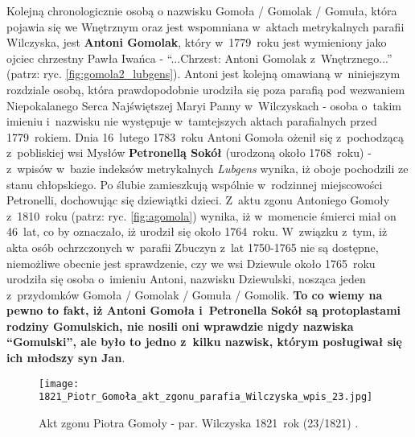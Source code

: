 Kolejną chronologicznie osobą o nazwisku Gomoła / Gomolak / Gomuła, która 
pojawia się we Wnętrznym oraz jest wspomniana w~aktach metrykalnych parafii 
Wilczyska, jest \textbf{Antoni Gomolak}, który w~1779~roku jest wymieniony 
jako ojciec chrzestny Pawła Iwańca - \enquote{...Chrzest: Antoni Gomolak 
z~Wnętrznego...} (patrz: ryc. \ref{fig:gomola2_lubgens}). Antoni jest kolejną 
omawianą w~niniejszym rozdziale osobą, która prawdopodobnie urodziła się poza 
parafią pod wezwaniem Niepokalanego Serca Najświętszej Maryi Panny 
w~Wilczyskach - osoba o~takim imieniu i~nazwisku nie występuje w~tamtejszych 
aktach parafialnych przed 1779~rokiem. Dnia 16~lutego 1783~roku Antoni Gomoła 
ożenił się z~pochodzącą z~pobliskiej wsi Mysłów \textbf{Petronellą Sokół} 
(urodzoną około 1768~roku) - z~wpisów w~bazie indeksów metrykalnych 
\emph{Lubgens} wynika, iż oboje pochodzili ze stanu chłopskiego. Po ślubie 
zamieszkują wspólnie w~rodzinnej miejscowości Petronelli, dochowując się 
dziewiątki dzieci. Z~aktu zgonu Antoniego Gomoły z~1810~roku (patrz: ryc. 
\ref{fig:agomola}) wynika, iż w~momencie śmierci miał on 46~lat, co by 
oznaczało, iż urodził się około 1764~roku. W~związku z~tym, iż akta osób 
ochrzczonych w~parafii Zbuczyn z~lat 1750-1765 nie są dostępne, niemożliwe 
obecnie jest sprawdzenie, czy we wsi Dziewule około 1765~roku urodziła się 
osoba o~imieniu Antoni, nazwisku Dziewulski, nosząca jeden z~przydomków 
Gomoła / Gomolak / Gomuła / Gomolik. \textbf{To co wiemy na pewno to fakt, iż 
Antoni Gomoła i~Petronella Sokół są protoplastami rodziny Gomulskich, nie 
nosili oni wprawdzie nigdy nazwiska \enquote{Gomulski}, ale było to jedno 
z~kilku nazwisk, którym posługiwał się ich młodszy syn Jan}.

\begin{figure}[!ht]
    \vspace*{0.5cm}
    \centering \texttt{[image: 
        1821\_Piotr\_Gomoła\_akt\_zgonu\_parafia\_Wilczyska\_wpis\_23.jpg]}
    \captionsetup{format=hang}
    \caption{Akt zgonu Piotra Gomoły - par. Wilczyska 1821~rok (23/1821) 
    \cite{par_wilczyska1}.}
    \label{fig:pbgomola}
\end{figure}

